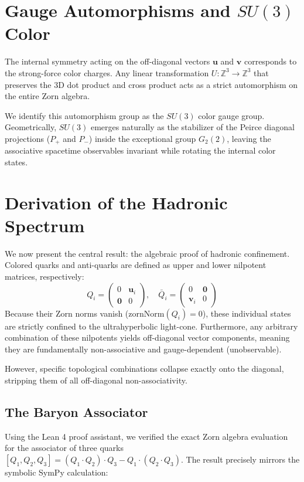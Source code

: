 \documentclass[11pt,a4paper]{article}
\begin{document}
\section{Gauge Automorphisms and $SU(3)$ Color}

The internal symmetry acting on the off-diagonal vectors $\mathbf{u}$ and $\mathbf{v}$ corresponds to the strong-force color charges. Any linear transformation $U: \mathbb{Z}^3 \to \mathbb{Z}^3$ that preserves the 3D dot product and cross product acts as a strict automorphism on the entire Zorn algebra. 

We identify this automorphism group as the $SU(3)$ color gauge group. Geometrically, $SU(3)$ emerges naturally as the stabilizer of the Peirce diagonal projections ($P_+$ and $P_-$) inside the exceptional group $G_2(2)$, leaving the associative spacetime observables invariant while rotating the internal color states.

\section{Derivation of the Hadronic Spectrum}

We now present the central result: the algebraic proof of hadronic confinement. Colored quarks and anti-quarks are defined as upper and lower nilpotent matrices, respectively:
\begin{equation}
Q_i = \begin{pmatrix} 0 & \mathbf{u}_i \\ \mathbf{0} & 0 \end{pmatrix}, \quad \bar{Q}_i = \begin{pmatrix} 0 & \mathbf{0} \\ \mathbf{v}_i & 0 \end{pmatrix}
\end{equation}
Because their Zorn norms vanish ($\text{zornNorm}(Q_i) = 0$), these individual states are strictly confined to the ultrahyperbolic light-cone. Furthermore, any arbitrary combination of these nilpotents yields off-diagonal vector components, meaning they are fundamentally non-associative and gauge-dependent (unobservable). 

However, specific topological combinations collapse exactly onto the diagonal, stripping them of all off-diagonal non-associativity.

\subsection{The Baryon Associator}
Using the Lean 4 proof assistant, we verified the exact Zorn algebra evaluation for the associator of three quarks $[Q_1, Q_2, Q_3] = (Q_1 \cdot Q_2) \cdot Q_3 - Q_1 \cdot (Q_2 \cdot Q_3)$. The result precisely mirrors the symbolic SymPy calculation:
\end{document}
